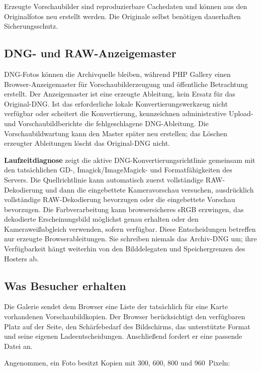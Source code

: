 \documentclass[11pt,a4paper]{article}
\newcommand{\ui}[1]{\textbf{#1}}
\begin{document}
Erzeugte Vorschaubilder sind reproduzierbare Cachedaten und können aus den
Originalfotos neu erstellt werden. Die Originale selbst benötigen dauerhaften
Sicherungsschutz.

\subsection{DNG- und RAW-Anzeigemaster}

DNG-Fotos können die Archivquelle bleiben, während PHP Gallery einen
Browser-Anzeigemaster für Vorschaubilderzeugung und öffentliche Betrachtung
erstellt. Der Anzeigemaster ist eine erzeugte Ableitung, kein Ersatz für das
Original-DNG. Ist das erforderliche lokale Konvertierungswerkzeug nicht
verfügbar oder scheitert die Konvertierung, kennzeichnen administrative Upload-
und Vorschaubildberichte die fehlgeschlagene DNG-Ableitung. Die
Vorschaubildwartung kann den Master später neu erstellen; das Löschen erzeugter
Ableitungen löscht das Original-DNG nicht.

\ui{Laufzeitdiagnose} zeigt die aktive DNG-Konvertierungsrichtlinie gemeinsam
mit den tatsächlichen GD-, Imagick/ImageMagick- und Formatfähigkeiten des
Servers. Die Quellrichtlinie kann automatisch zuerst vollständige
RAW-Dekodierung und dann die eingebettete Kameravorschau versuchen, ausdrücklich
vollständige RAW-Dekodierung bevorzugen oder die eingebettete Vorschau
bevorzugen. Die Farbverarbeitung kann browsersicheres sRGB erzwingen, das
dekodierte Erscheinungsbild möglichst genau erhalten oder den Kameraweißabgleich
verwenden, sofern verfügbar. Diese Entscheidungen betreffen nur erzeugte
Browserableitungen. Sie schreiben niemals das Archiv-DNG um; ihre Verfügbarkeit
hängt weiterhin von den Bilddelegaten und Speichergrenzen des Hosters ab.

\subsection{Was Besucher erhalten}

Die Galerie sendet dem Browser eine Liste der tatsächlich für eine Karte
vorhandenen Vorschaubildkopien. Der Browser berücksichtigt den verfügbaren Platz
auf der Seite, den Schärfebedarf des Bildschirms, das unterstützte Format und
seine eigenen Ladeentscheidungen. Anschließend fordert er eine passende Datei
an.

Angenommen, ein Foto besitzt Kopien mit 300, 600, 800 und 960~Pixeln:
\end{document}
